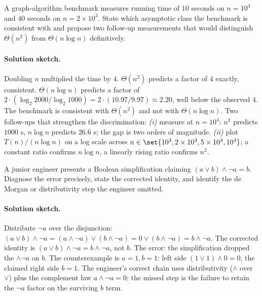 \begin{exercise}
A graph-algorithm benchmark measures running time of $10$ seconds on
$n = 10^{3}$ and $40$ seconds on $n = 2 \times 10^{3}$. State which
asymptotic class the benchmark is consistent with and propose two
follow-up measurements that would distinguish $\Theta(n^{2})$ from
$\Theta(n \log n)$ definitively.
\end{exercise}

\paragraph{Solution sketch.}
Doubling $n$ multiplied the time by $4$. $\Theta(n^{2})$ predicts a
factor of $4$ exactly, consistent. $\Theta(n \log n)$ predicts a
factor of $2 \cdot (\log_{2} 2000 / \log_{2} 1000) = 2 \cdot
(10.97 / 9.97) \approx 2.20$, well below the observed $4$. The
benchmark is consistent with $\Theta(n^{2})$ and not with
$\Theta(n \log n)$. Two follow-ups that strengthen the
discrimination: \textit{(i)} measure at $n = 10^{4}$: $n^{2}$
predicts $1000$ s, $n \log n$ predicts $26.6$ s; the gap is two
orders of magnitude. \textit{(ii)} plot $T(n) / (n \log n)$ on a
log scale across $n \in \set{10^{3}, 2 \times 10^{3}, 5 \times
10^{3}, 10^{4}}$; a constant ratio confirms $n \log n$, a linearly
rising ratio confirms $n^{2}$.

\begin{exercise}
A junior engineer presents a Boolean simplification claiming
$(a \lor b) \land \lnot a = b$. Diagnose the error precisely, state
the corrected identity, and identify the de Morgan or
distributivity step the engineer omitted.
\end{exercise}

\paragraph{Solution sketch.}
Distribute $\lnot a$ over the disjunction: $(a \lor b) \land
\lnot a = (a \land \lnot a) \lor (b \land \lnot a) = 0 \lor (b
\land \lnot a) = b \land \lnot a$. The corrected identity is
$(a \lor b) \land \lnot a = b \land \lnot a$, not $b$. The error:
the simplification dropped the $\land \lnot a$ on $b$. The
counterexample is $a = 1, b = 1$: left side $(1 \lor 1) \land 0 =
0$, the claimed right side $b = 1$. The engineer's correct chain
uses distributivity ($\land$ over $\lor$) plus the complement law
$a \land \lnot a = 0$; the missed step is the failure to retain
the $\lnot a$ factor on the surviving $b$ term.

